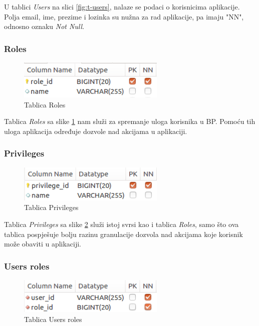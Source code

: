 \documentclass[zavrsni, numeric]{fer}
\begin{document}
U tablici \textit{Users} na slici \ref{fig:t-users}, nalaze se podaci o korisnicima aplikacije. Polja email, ime, prezime i lozinka su nužna za rad aplikacije, pa imaju "NN", odnosno oznaku \textit{Not Null}.

\subsubsection{Roles}

\begin{figure}[H]
	\centering
	\includegraphics[width=7cm]{slike/t-roles.png}
	\caption{Tablica Roles}
	\label{fig:t-roles}
\end{figure}

Tablica \textit{Roles} sa slike \ref{fig:t-roles} nam služi za spremanje uloga korisnika u BP. Pomoću tih uloga aplikacija određuje dozvole nad akcijama u aplikaciji.

\subsubsection{Privileges}

\begin{figure}[H]
	\centering
	\includegraphics[width=7cm]{slike/t-privileges.png}
	\caption{Tablica Privileges}
	\label{fig:t-privileges}
\end{figure}

Tablica \textit{Privileges} sa slike \ref{fig:t-privileges} služi istoj svrsi kao i tablica \textit{Roles}, samo što ova tablica pospješuje bolju razinu granulacije dozvola nad akcijama koje korisnik može obaviti u aplikaciji.

\subsubsection{Users roles}

\begin{figure}[H]
	\centering
	\includegraphics[width=7cm]{slike/t-users_roles.png}
	\caption{Tablica Users roles}
	\label{fig:t-users_roles}
\end{figure}
\end{document}
